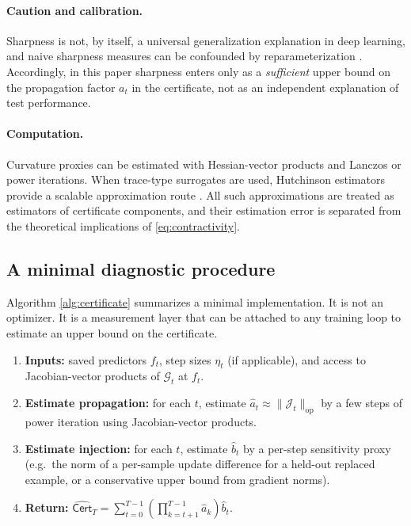 \documentclass{article}
\numberwithin{equation}{section}
\begin{document}
\paragraph{Caution and calibration.}
Sharpness is not, by itself, a universal generalization explanation in deep learning, and naive sharpness measures can be confounded by reparameterization \cite{Dinh2017sharp}.
Accordingly, in this paper sharpness enters only as a \emph{sufficient} upper bound on the propagation factor $a_t$ in the certificate, not as an independent explanation of test performance.

\paragraph{Computation.}
Curvature proxies can be estimated with Hessian-vector products and Lanczos or power iterations.
When trace-type surrogates are used, Hutchinson estimators provide a scalable approximation route \cite{avron2011randomized}.
All such approximations are treated as estimators of certificate components, and their estimation error is separated from the theoretical implications of \eqref{eq:contractivity}.

\subsection{A minimal diagnostic procedure}
\label{subsec:algorithm}

Algorithm \ref{alg:certificate} summarizes a minimal implementation.
It is not an optimizer.
It is a measurement layer that can be attached to any training loop to estimate an upper bound on the certificate.

\begin{algorithm}[t]
	\caption{Estimating a stability certificate from training primitives}
	\label{alg:certificate}
	\begin{enumerate}
		\item \textbf{Inputs:} saved predictors $f_t$, step sizes $\eta_t$ (if applicable), and access to Jacobian-vector products of $\mathcal{G}_t$ at $f_t$.
		\item \textbf{Estimate propagation:} for each $t$, estimate $\widehat{a}_t \approx \|\mathcal{J}_t\|_{\mathrm{op}}$ by a few steps of power iteration using Jacobian-vector products.
		\item \textbf{Estimate injection:} for each $t$, estimate $\widehat{b}_t$ by a per-step sensitivity proxy (e.g.\ the norm of a per-sample update difference for a held-out replaced example, or a conservative upper bound from gradient norms).
		\item \textbf{Return:} $\widehat{\mathsf{Cert}}_T = \sum_{t=0}^{T-1}\left(\prod_{k=t+1}^{T-1}\widehat{a}_k\right)\widehat{b}_t$.
	\end{enumerate}
\end{algorithm}
\end{document}
